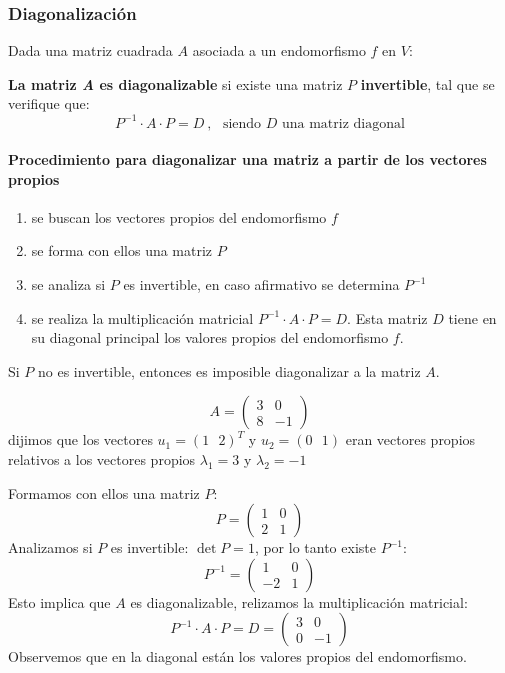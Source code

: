 \subsubsection{Diagonalización}

Dada una matriz cuadrada \(A\) asociada a un endomorfismo \(f\) en \(V\):

\textbf{La matriz \textit{A} es diagonalizable} si existe una matriz \(P\) \textbf{invertible}, tal que se verifique que:
\[
  P^{-1} \cdot A \cdot P = D~ , ~~~ \text{siendo } D \text{ una matriz diagonal}
\]
\paragraph{Procedimiento para diagonalizar una matriz a partir de los vectores propios}

\begin{enumerate}[label=\arabic{*}^\circ]
  \item se buscan los vectores propios del endomorfismo \(f\)
  \item se forma con ellos una matriz \(P\)
  \item se analiza si \(P\) es invertible, en caso afirmativo se determina \(P^{-1}\)
  \item se realiza la multiplicación matricial \(P^{-1}\cdot A \cdot P = D\). Esta matriz \(D\) tiene en su diagonal principal los valores propios del endomorfismo \(f\). 
\end{enumerate}
Si \(P\) no es invertible, entonces es imposible diagonalizar a la matriz \(A\).

\[
  A = \begin{pmatrix}
    3 & 0 \\ 8 & -1
  \end{pmatrix}
\]
dijimos que los vectores \(u_1=(1 ~~~ 2)^T\) y \(u_2 =(0 ~~~ 1)\) eran vectores propios relativos a los vectores propios \(\lambda_1 = 3\) y \(\lambda_2 = -1\)

Formamos con ellos una matriz \(P\):
\[
  P = \begin{pmatrix}
    1 & 0 \\
    2 & 1 
  \end{pmatrix}
\]
Analizamos si \(P\) es invertible: \(\det P = 1\), por lo tanto existe \(P^{-1}\):
\[
P^{-1} = \begin{pmatrix}
  1 & 0 \\
  -2 & 1
\end{pmatrix}
\]
Esto implica que \(A\) es diagonalizable, relizamos la multiplicación matricial:
\[
P^{-1} \cdot A \cdot P = D = \begin{pmatrix}
  3 & 0 \\
  0 & -1
\end{pmatrix}
\]
Observemos que en la diagonal están los valores propios del endomorfismo.

